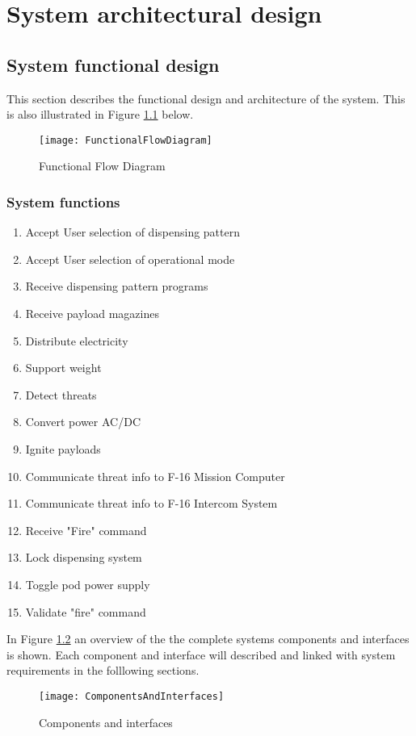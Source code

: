 \documentclass[Main]{subfiles}
\begin{document}
\chapter{System architectural design}
\section{System functional design}
This section describes the functional design and architecture of the system.
This is also illustrated in Figure \ref{fig:FFD} below.

\begin{figure}[H]
\centering
\texttt{[image: FunctionalFlowDiagram]}
\caption{Functional Flow Diagram}
\label{fig:FFD}
\end{figure}

\subsection{System functions}
\begin{enumerate}[label=F.\arabic*:]
\item Accept User selection of dispensing pattern
\item Accept User selection of operational mode
\item Receive dispensing pattern programs
\item Receive payload magazines
\item Distribute electricity
\item Support weight
\item Detect threats
\item Convert power AC/DC
\item Ignite payloads
\item Communicate threat info to F-16 Mission Computer
\item Communicate threat info to F-16 Intercom System
\item Receive "Fire" command
\item Lock dispensing system
\item Toggle pod power supply
\item Validate "fire" command




\end{enumerate}


In Figure \ref{fig:ComponentsAndInterfaces} an overview of the the complete systems components and interfaces is shown. Each component and interface will described and linked with system requirements in the folllowing sections.

\begin{figure}[H]
\centering
\texttt{[image: ComponentsAndInterfaces]}
\caption{Components and interfaces}
\label{fig:ComponentsAndInterfaces}
\end{figure}


\newpage

\newpage

\end{document}
